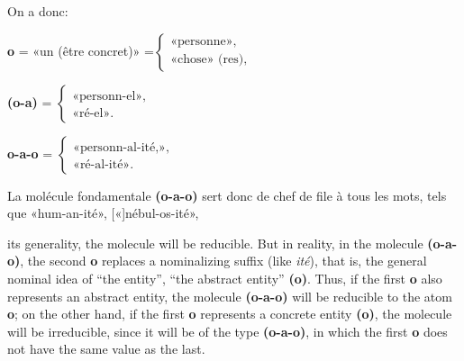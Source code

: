 \begin{sloppypar}
{{     On a donc:
     \begin{center}
       {\setlength{\arraycolsep}{0pt} \textbf{o} = «un
         (être concret)» =$\left\{
           \begin{array}{l}
             \mbox{«personne»,}\\
             \mbox{«chose» (res),}
           \end{array}
         \right.$
    
         \textbf{(o-a)} = $\left\{
           \begin{array}{l}
             \mbox{«personn-el»,}\\
             \mbox{«ré-el».}
           \end{array}
         \right.$
    
         \textbf{o-a-o} = $\left\{
           \begin{array}{l}
             \mbox{«personn-al-ité,»,}\\
             \mbox{«ré-al-ité».}
           \end{array}
         \right.$ }
     \end{center}

     La molécule fondamentale \textbf{(o-a-o)} sert donc de
     chef de file à tous les mots, tels que «hum-an-ité»,
     [«]nébul-os-ité»,}

 }
% 
 {\noindent
   {\small
     its generality, the molecule will be reducible. But in reality,
     in the molecule \textbf{(o-a-o)}, the second \textbf{o} replaces
     a nominalizing suffix (like \emph{ité}), that is, the general
     nominal idea of ``the entity'', ``the abstract entity''
     \textbf{(o)}. Thus, if the first \textbf{o} also represents an
     abstract entity, the molecule \textbf{(o-a-o)} will be reducible
     to the atom \textbf{o}; on the other hand, if the first
     \textbf{o} represents a concrete entity \textbf{(o)},
     the molecule will be irreducible, since it will be of the type
     \textbf{(o-a-o)}, in which the first \textbf{o} does not
     have the same value as the last.

}}
\end{sloppypar}
